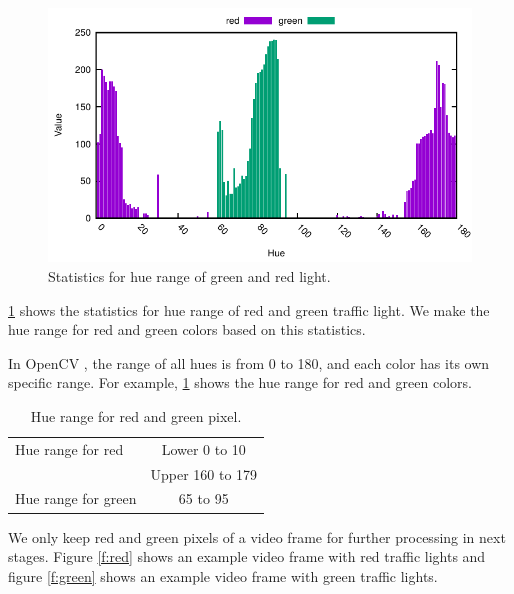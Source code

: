 \begin{figure}[!ht]
\centering
\includegraphics[width=5.2in]{plots/stat_light.pdf}
\caption{Statistics for hue range of green and red light.}
\label{f:light_hue}
\end{figure}

\ref{f:light_hue} shows the statistics for hue range of red and green traffic light.
We make the hue range for red and green colors based on this statistics.

 In OpenCV \cite{opencv}, the range of all hues is from 0 to 180, and each color has its own specific range.
For example, \ref{t:hue_range} shows the hue range for red and green colors.

\begin{table}[h!]
  \centering
  \caption{Hue range for red and green pixel.}
  \label{t:hue_range}
  \begin{tabular}{  l | c  }
    \hline
    Hue range for red & Lower 0 to 10 \\ \cline{2-2}
    & Upper 160 to 179 \\
    \hline \hline
    Hue range for green & 65 to 95 \\
    \hline
  \end{tabular}
\end{table}


We only keep red and green pixels of a video frame for further processing in next stages.
Figure \ref{f:red} shows an example video frame with red traffic lights and figure \ref{f:green} shows an example video frame with green traffic lights.

